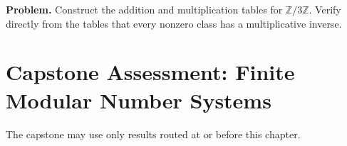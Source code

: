 \newpage
{}
\label{cap:finite-modular-number-systems}

\begin{tcolorbox}[
  colback=gray!6,
  colframe=gray!40,
  arc=2pt,
  left=8pt, right=8pt, top=6pt, bottom=6pt,
  title={\small\textbf{Capstone Problem}},
  fonttitle=\small\bfseries
]
\textbf{Problem.}
Construct the addition and multiplication tables for
\(\mathbb{Z}/3\mathbb{Z}\). Verify directly from the tables that every
nonzero class has a multiplicative inverse.
\end{tcolorbox}

\section{Capstone Assessment: Finite Modular Number Systems}

\begin{remark*}
The capstone may use only results routed at or before this chapter.
\end{remark*}

\clearpage
